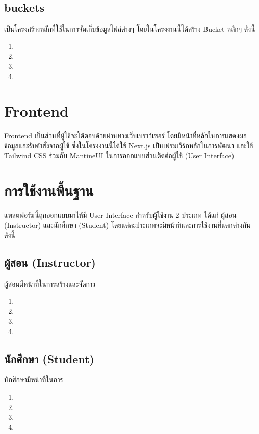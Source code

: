   \subsection{buckets} เป็นโครงสร้างหลักที่ใช้ในการจัดเก็บข้อมูลไฟล์ต่างๆ โดยในโครงงานนี้ได้สร้าง Bucket หลักๆ ดังนี้
    \begin{enumerate}
      \item 
      \item 
      \item 
      \item 
    \end{enumerate}

\section{Frontend}
  \qquad Frontend เป็นส่วนที่ผู้ใช้จะโต้ตอบด้วยผ่านทางเว็บเบราว์เซอร์ โดยมีหน้าที่หลักในการแสดงผลข้อมูลและรับคำสั่งจากผู้ใช้
  ซึ่งในโครงงานนี้ได้ใช้ Next.js เป็นเฟรมเวิร์กหลักในการพัฒนา และใช้ Tailwind CSS ร่วมกับ MantineUI ในการออกแบบส่วนติดต่อผู้ใช้ (User Interface)

  \section{การใช้งานพื้นฐาน}
    \qquad แพลตฟอร์มนี้ถูกออกแบบมาให้มี User Interface สำหรับผู้ใช้งาน 2 ประเภท ได้แก่ ผู้สอน (Instructor) และนักศึกษา (Student) โดยแต่ละประเภทจะมีหน้าที่และการใช้งานที่แตกต่างกัน ดังนี้
  \subsection{ผู้สอน (Instructor)}
    \par\hspace*{3em} ผู้สอนมีหน้าที่ในการสร้างและจัดการ
    \begin{enumerate}
        \item 
        \item 
        \item 
        \item 
    \end{enumerate}
  \subsection{นักศึกษา (Student)}
    \par\hspace*{3em} นักศึกษามีหน้าที่ในการ
    \begin{enumerate}
        \item 
        \item 
        \item 
        \item 
    \end{enumerate}
